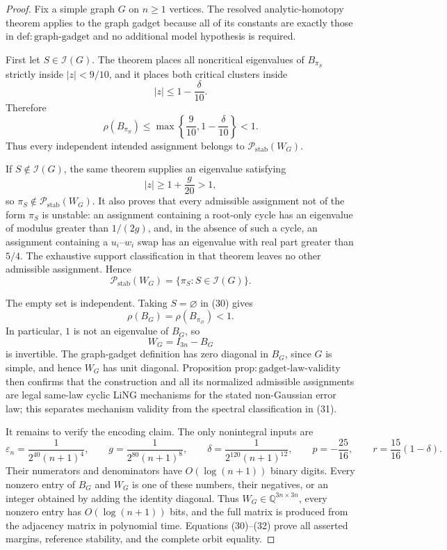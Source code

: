 \documentclass{article}
\begin{document}
\begin{proof}
Fix a simple graph \(G\) on \(n\geq1\) vertices. The resolved analytic-homotopy theorem applies to the graph gadget because all of its constants are exactly those in \(\mathrm{def:graph\mbox{-}gadget}\) and no additional model hypothesis is required.

First let \(S\in\mathcal I(G)\). The theorem places all noncritical eigenvalues of \(B_{\pi_S}\) strictly inside \(|z|<9/10\), and it places both critical clusters inside
\[
 |z|\leq1-\frac{\delta}{10}.
\]
Therefore
\[
 \rho(B_{\pi_S})
 \leq\max\!\left\{\frac9{10},1-\frac{\delta}{10}\right\}<1.
\tag{30}
\]
Thus every independent intended assignment belongs to
\(\mathcal P_{\mathrm{stab}}(W_G)\).

If \(S\notin\mathcal I(G)\), the same theorem supplies an eigenvalue satisfying
\[
 |z|\geq1+\frac g{20}>1,
\]
so \(\pi_S\notin\mathcal P_{\mathrm{stab}}(W_G)\). It also proves that every admissible assignment not of the form \(\pi_S\) is unstable: an assignment containing a root-only cycle has an eigenvalue of modulus greater than \(1/(2g)\), and, in the absence of such a cycle, an assignment containing a \(u_i\)--\(w_i\) swap has an eigenvalue with real part greater than \(5/4\). The exhaustive support classification in that theorem leaves no other admissible assignment. Hence
\[
 \mathcal P_{\mathrm{stab}}(W_G)
 =\{\pi_S:S\in\mathcal I(G)\}.
\tag{31}
\]

The empty set is independent. Taking \(S=\varnothing\) in (30) gives
\[
 \rho(B_G)=\rho(B_{\pi_\varnothing})<1.
\tag{32}
\]
In particular, \(1\) is not an eigenvalue of \(B_G\), so
\[
 W_G=I_{3n}-B_G
\]
is invertible. The graph-gadget definition has zero diagonal in \(B_G\), since \(G\) is simple, and hence \(W_G\) has unit diagonal. Proposition \(\mathrm{prop:gadget\mbox{-}law\mbox{-}validity}\) then confirms that the construction and all its normalized admissible assignments are legal same-law cyclic LiNG mechanisms for the stated non-Gaussian error law; this separates mechanism validity from the spectral classification in (31).

It remains to verify the encoding claim. The only nonintegral inputs are
\[
 \varepsilon_n=\frac1{2^{40}(n+1)^4},\qquad
 g=\frac1{2^{80}(n+1)^8},\qquad
 \delta=\frac1{2^{120}(n+1)^{12}},\qquad
 p=-\frac{25}{16},\qquad
 r=\frac{15}{16}(1-\delta).
\]
Their numerators and denominators have \(O(\log(n+1))\) binary digits. Every nonzero entry of \(B_G\) and \(W_G\) is one of these numbers, their negatives, or an integer obtained by adding the identity diagonal. Thus \(W_G\in\mathbb Q^{3n\times3n}\), every nonzero entry has \(O(\log(n+1))\) bits, and the full matrix is produced from the adjacency matrix in polynomial time. Equations (30)--(32) prove all asserted margins, reference stability, and the complete orbit equality.
\end{proof}
\end{document}
